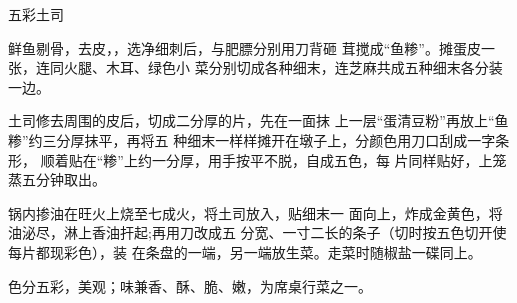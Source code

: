 \begin{recipe}{五彩土司}

\ingredients



\cooking

\step 鲜鱼剔骨，去皮，，选净细刺后，与肥膘分别用刀背砸 茸搅成“鱼糁”。摊蛋皮一张，连同火腿、木耳、绿色小 菜分别切成各种细末，连芝麻共成五种细末各分装一边。

\step 土司修去周围的皮后，切成二分厚的片，先在一面抹 上一层“蛋清豆粉”再放上“鱼糁”约三分厚抹平，再将五 种细末一样样摊开在墩子上，分颜色用刀口刮成一字条形， 顺着贴在“糁”上约一分厚，用手按平不脱，自成五色，每 片同样贴好，上笼蒸五分钟取出。

\step 锅内掺油在旺火上烧至七成火，将土司放入，贴细末一 面向上，炸成金黄色，将油泌尽，淋上香油扞起;再用刀改成五 分宽、一寸二长的条子（切时按五色切开使每片都现彩色），装 在条盘的一端，另一端放生菜。走菜时随椒盐一碟同上。

\notes

色分五彩，美观；味兼香、酥、脆、嫩，为席桌行菜之一。

\end{recipe}

